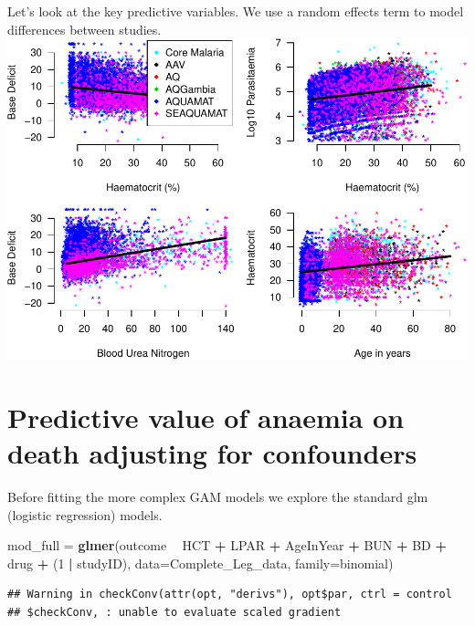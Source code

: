 \documentclass[]{article}
\newenvironment{Shaded}{\begin{snugshade}}{\end{snugshade}}
\newcommand{\KeywordTok}[1]{\textcolor[rgb]{0.13,0.29,0.53}{\textbf{#1}}}
\newcommand{\DataTypeTok}[1]{\textcolor[rgb]{0.13,0.29,0.53}{#1}}
\newcommand{\DecValTok}[1]{\textcolor[rgb]{0.00,0.00,0.81}{#1}}
\newcommand{\StringTok}[1]{\textcolor[rgb]{0.31,0.60,0.02}{#1}}
\newcommand{\OperatorTok}[1]{\textcolor[rgb]{0.81,0.36,0.00}{\textbf{#1}}}
\newcommand{\NormalTok}[1]{#1}
\begin{document}
Let's look at the key predictive variables. We use a random effects term
to model differences between studies.
\includegraphics{LegacyAnalysis_files/figure-latex/ExploratoryPlots-1.pdf}

\section{Predictive value of anaemia on death adjusting for
confounders}\label{predictive-value-of-anaemia-on-death-adjusting-for-confounders}

Before fitting the more complex GAM models we explore the standard glm
(logistic regression) models.

\begin{Shaded}
\begin{Highlighting}[]
\NormalTok{mod_full =}\StringTok{ }\KeywordTok{glmer}\NormalTok{(outcome }\OperatorTok{~}\StringTok{ }\NormalTok{HCT }\OperatorTok{+}\StringTok{ }\NormalTok{LPAR }\OperatorTok{+}\StringTok{ }\NormalTok{AgeInYear }\OperatorTok{+}\StringTok{ }\NormalTok{BUN }\OperatorTok{+}\StringTok{ }\NormalTok{BD }\OperatorTok{+}\StringTok{ }\NormalTok{drug }\OperatorTok{+}\StringTok{ }\NormalTok{(}\DecValTok{1} \OperatorTok{|}\StringTok{ }\NormalTok{studyID),}
               \DataTypeTok{data=}\NormalTok{Complete_Leg_data, }\DataTypeTok{family=}\NormalTok{binomial)}
\end{Highlighting}
\end{Shaded}

\begin{verbatim}
## Warning in checkConv(attr(opt, "derivs"), opt$par, ctrl = control
## $checkConv, : unable to evaluate scaled gradient
\end{verbatim}
\end{document}
